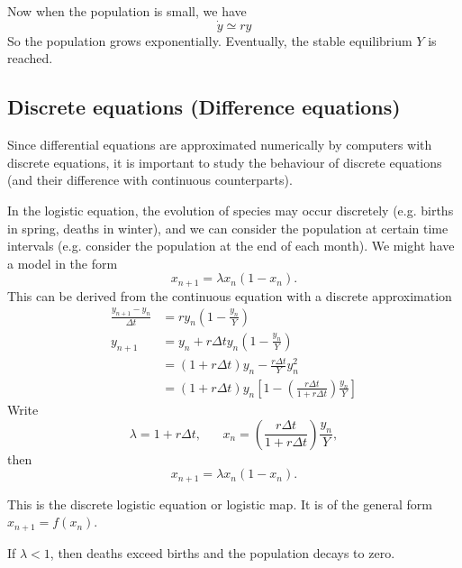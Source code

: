 \documentclass[a4paper]{article}
\begin{document}
Now when the population is small, we have
\[
\dot y \simeq ry
\]
So the population grows exponentially. Eventually, the stable equilibrium $Y$ is reached.

\subsection{Discrete equations (Difference equations)}
Since differential equations are approximated numerically by computers with discrete equations, it is important to study the behaviour of discrete equations (and their difference with continuous counterparts).

In the logistic equation, the evolution of species may occur discretely (e.g. births in spring, deaths in winter), and we can consider the population at certain time intervals (e.g. consider the population at the end of each month). We might have a model in the form
\[
x_{n + 1} = \lambda x_n(1 - x_n).
\]
This can be derived from the continuous equation with a discrete approximation
\begin{align*}
  \frac{y_{n+1} - y_n}{\Delta t} &= ry_n\left(1 - \frac{y_n}{Y}\right)\\
  y_{n + 1} &= y_n + r\Delta ty_n\left(1 - \frac{y_n}{Y}\right)\\
  &= (1 + r\Delta t)y_n - \frac{r\Delta t}{Y}y_n^2\\
  &= (1 + r\Delta t)y_n\left[1 - \left(\frac{r\Delta t}{1 + r\Delta t}\right)\frac{y_n}{Y}\right]
\end{align*}
Write
\[
\lambda = 1 + r\Delta t,\;\;\;\;\;\; x_n = \left(\frac{r\Delta t}{1 + r\Delta t}\right)\frac{y_n}{Y},
\]
then
\[
x_{n+1}=\lambda x_n(1 - x_n).
\]

This is the discrete logistic equation or logistic map. It is of the general form $x_{n + 1} = f(x_n)$.

If $\lambda  < 1$, then deaths exceed births and the population decays to zero.

\begin{center}
\end{center}
\end{document}
